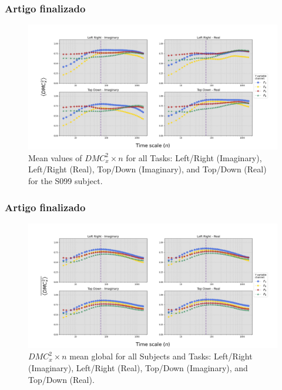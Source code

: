 \documentclass[11pt, aspectratio=169]{beamer}
\begin{document}
  \begin{frame}
    \frametitle{Artigo finalizado}
  
\begin{figure}[!h]
	\includegraphics[height=.5\paperheight]{../Figures/art_02/Fig7.jpg}
	\caption{Mean values of $DMC_{x}^{2} \times n$ for all Tasks: Left/Right (Imaginary), Left/Right (Real), Top/Down (Imaginary), and Top/Down (Real) for the S099 subject.}
	\label{fig07}
\end{figure}
  \end{frame}

\begin{frame}
    \frametitle{Artigo finalizado}
  
\begin{figure}[!h]
	\includegraphics[height=.5\paperheight]{../Figures/art_02/Fig8.jpg}
	\caption{$DMC_{x}^{2} \times n$ mean global for all Subjects and Tasks: Left/Right (Imaginary), Left/Right (Real), Top/Down (Imaginary), and Top/Down (Real).}
	\label{fig08}
\end{figure}
\end{frame}
\end{document}
